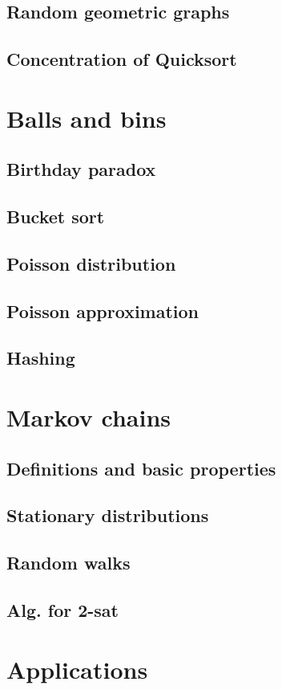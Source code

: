 \documentclass{book}
\begin{document}
\section{Random geometric graphs}
\section{Concentration of Quicksort}

\chapter{Balls and bins}
\section{Birthday paradox}
\section{Bucket sort}
\section{Poisson distribution} 
\section{Poisson approximation}
\section{Hashing}

\chapter{Markov chains}
\section{Definitions and basic properties}
\section{Stationary distributions}
\section{Random walks}
\section{Alg. for 2-sat}

\chapter{Applications}
\end{document}
